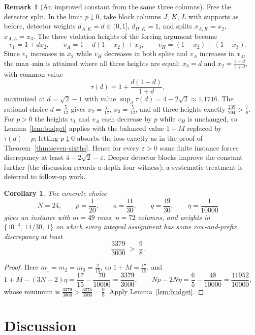 \documentclass[11pt]{article}
\newtheorem{corollary}[theorem]{Corollary}
\theoremstyle{definition}
\newtheorem{remark}[theorem]{Remark}
\newcommand{\eps}{\varepsilon}
\begin{document}
\begin{remark}[An improved constant from the same three columns]
\label{rem:improved}
Free the detector split.  In the limit $p\downarrow0$, take block columns
$J$, $K$, $L$ with supports as before, detector weights
$d_{A,K}=d\in(0,1]$, $d_{H,K}=1$, and splits $x_{A,K}=x_2$,
$x_{A,L}=x_3$.  The three violation heights of the forcing argument become
\[
 v_1=1+dx_2,
 \qquad
 v_A=1-d(1-x_2)+x_3,
 \qquad
 v_H=(1-x_2)+(1-x_3).
\]
Since $v_1$ increases in $x_2$ while $v_H$ decreases in both splits and
$v_A$ increases in $x_3$, the max--min is attained where all three heights
are equal: $x_3=d$ and $x_2=\frac{1-d}{1+d}$, with common value
\[
 \tau(d)=1+\frac{d(1-d)}{1+d},
\]
maximized at $d=\sqrt2-1$ with value $\sup_d\tau(d)=4-2\sqrt2\approx1.1716$.
The rational choice $d=\frac5{12}$ gives $x_2=\frac7{17}$, $x_3=\frac5{12}$,
and all three heights exactly $\frac{239}{204}>\frac76$.  For $p>0$ the
heights $v_1$ and $v_A$ each decrease by $p$ while $v_H$ is unchanged, so
Lemma~\ref{lem:budget} applies with the balanced value $1+M$ replaced by
$\tau(d)-p$; letting $p\downarrow0$ absorbs the loss exactly as in the proof
of Theorem~\ref{thm:seven-sixths}.  Hence for every $\eps>0$ some finite
instance forces discrepancy at least $4-2\sqrt2-\eps$.  Deeper detector
blocks improve the constant further (the discussion records a depth-four
witness); a systematic treatment is deferred to follow-up work.
\end{remark}

\begin{corollary}\label{cor:nine-eighths}
The concrete choice
\[
 N=24,\qquad p=\frac1{20},\qquad a=\frac{11}{30},
 \qquad q=\frac{19}{30},\qquad\eta=\frac1{10000}
\]
gives an instance with $m=49$ rows, $n=72$ columns, and weights in
$\{10^{-4},\,11/30,\,1\}$ on which every integral assignment has some
row-and-prefix discrepancy at least
\[
 \frac{3379}{3000}\;>\;\frac98 .
\]
\end{corollary}

\begin{proof}
Here $m_1=m_2=m_3=\frac2{15}$, so $1+M=\frac{17}{15}$, and
\[
 1+M-(3N-2)\eta=\frac{17}{15}-\frac{70}{10000}=\frac{3379}{3000},
 \qquad
 Np-2N\eta=\frac65-\frac{48}{10000}=\frac{11952}{10000},
\]
whose minimum is $\frac{3379}{3000}>\frac{3375}{3000}=\frac98$.
Apply Lemma~\ref{lem:budget}.
\end{proof}

\section{Discussion}
\end{document}
